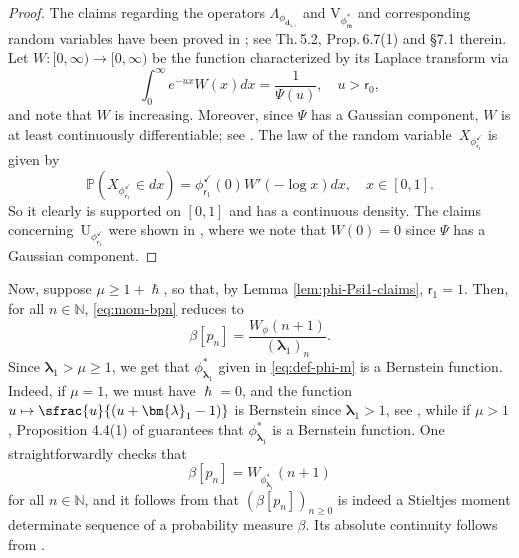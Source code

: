 \documentclass[10pt]{amsart}
\let\epsilon\varepsilon
\newcommand\mto{\mathchoice{\longmapsto}{\mapsto}{\mapsto}{\mapsto}}
\newcommand{\spfrac}[2]{\sfrac{#1}{(#2)}}
\theoremstyle{plain}
\theoremstyle{definition}
\newcommand{\N}{\mathbb{N}}
\newcommand{\Prob}{\mathbb{P}}
\newcommand{\m}{\mathfrak{m}}
\newcommand{\dz}{{\bm{d}}_{1,\epsilon}}
\newcommand{\lam}{{\bm{\lambda}_1}}
\newcommand{\tet}{{\mathsf{r}_0}}
\newcommand{\vat}{{\mathsf{r}_1}}
\newcommand{\phm}{{\phi_\m^*}}
\renewcommand{\varphi}{{\phi_{\vat}^{\checkmark}}}
\let\h\hslash
\let\mo\mu
\let\bpsi\beta
\begin{document}
\begin{proof}
The claims regarding the operators $\Lambda_{\phi_{\dz}}$ and $\mathrm{V}_{\phm}$ and corresponding random variables have been proved in \cite{Patie-Savov-GeL}; see Th.\,5.2, Prop.\,6.7(1) and \S 7.1 therein. Let $W \colon [0,\infty) \to [0,\infty)$ be the function characterized by its Laplace transform via
\begin{equation*}
\int_{0}^{\infty}e^{-u x}W(x)dx = \frac{1}{\Psi(u)}, \quad u > \tet,
\end{equation*}
and note that $W$ is increasing. Moreover, since $\Psi$ has a Gaussian component, $W$ is at least continuously differentiable; see \eg \cite[\S 8.2]{Kyprianou2014}. The law of the random variable~$X_\varphi$ is given by
\begin{equation*}
\Prob(X_\varphi \in dx) = \varphi(0)W'(-\log x)dx, \quad x \in [0,1].
\end{equation*}
So it clearly is supported on $[0,1]$ and has a continuous density. The claims concerning~$\mathrm{U}_{\varphi}$ were shown in \cite[Lem.\,4.2]{Intertwining-Krein}, where we note that $W(0)=0$ since $\Psi$ has a Gaussian component.
\end{proof}

Now, suppose $\mo \geq 1+\h$, so that, by Lemma \ref{lem:phi-Psi1-claims}, $\vat= 1$. Then, for all $n\in\N$, \eqref{eq:mom-bpn} reduces to
\begin{equation*}
\bpsi[p_n] = \frac{W_{\phi}(n+1)}{(\lam)_n}.
\end{equation*}
Since $\lam > \mo \geq 1$, we get that $\phi_{\lam}^*$ given in \eqref{eq:def-phi-m} is a Bernstein function. Indeed, if $\mo = 1$, we must have $\h = 0$, and the function $u \mto \spfrac{u}{u+\lam-1}$ is Bernstein since $\lam > 1$, see \eg \cite[Chap.\,16]{SchillingSongVondracek10}, while if $\mo > 1$, Proposition 4.4(1) of \cite{SchillingSongVondracek10}
guarantees that $\phi_{\lam}^*$ is a Bernstein function. One straightforwardly checks that
\begin{equation*}
\bpsi[p_n] = W_{\phi_{\lam}^*}(n+1)
\end{equation*}
for all $n\in \mathbb{N}$, and it follows from \cite{Berg} that $(\bpsi [p_n])_{n\geq 0}$ is indeed a Stieltjes moment determinate sequence of a probability measure $\bpsi$. Its absolute continuity follows from \cite[Prop.\,2.4]{Patie-11-Factorization_e}.
\end{document}
